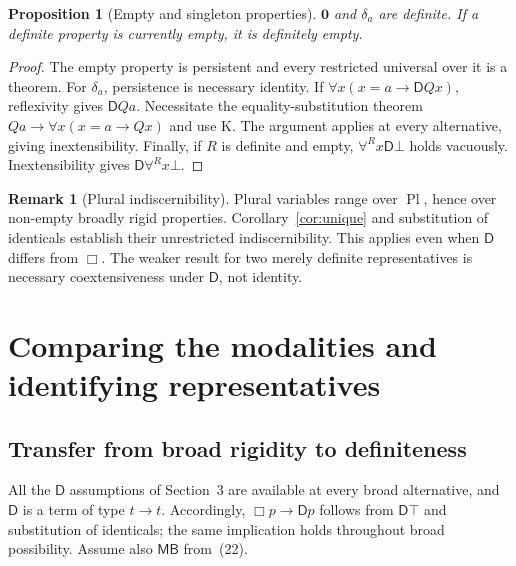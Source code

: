 \documentclass[11pt]{article}
\newtheorem{proposition}[theorem]{Proposition}
\theoremstyle{definition}
\newtheorem{remark}[theorem]{Remark}
\newcommand{\D}{\mathsf D}
\newcommand{\Pl}{\operatorname{Pl}}
\newcommand{\Z}{\mathbf 0}
\newcommand{\sng}[1]{\delta_{#1}}
\numberwithin{equation}{section}
\begin{document}
\begin{proposition}[Empty and singleton properties]\label{prop:singletons}
$\Z$ and $\sng a$ are definite. If a definite property is currently empty, it is definitely empty.
\end{proposition}
\begin{proof}
The empty property is persistent and every restricted universal over it is a theorem. For $\sng a$, persistence is necessary identity. If $\forall x(x=a\rightarrow\D Qx)$, reflexivity gives $\D Qa$. Necessitate the equality-substitution theorem $Qa\rightarrow\forall x(x=a\rightarrow Qx)$ and use K. The argument applies at every alternative, giving inextensibility. Finally, if $R$ is definite and empty, $\forall^R x\D\bot$ holds vacuously. Inextensibility gives $\D\forall^R x\bot$.
\end{proof}

\begin{remark}[Plural indiscernibility]
Plural variables range over $\Pl$, hence over non-empty broadly rigid properties. Corollary~\ref{cor:unique} and substitution of identicals establish their unrestricted indiscernibility. This applies even when $\D $ differs from $\Box$. The weaker result for two merely definite representatives is necessary coextensiveness under $\D $, not identity.
\end{remark}

\section{Comparing the modalities and identifying representatives}\label{app:identity}

\subsection{Transfer from broad rigidity to definiteness}

All the $\D $ assumptions of Section~3 are available at every broad alternative, and $\D $ is a term of type $t\to t$. Accordingly, $\Box p\rightarrow \D p$ follows from $\D \top$ and substitution of identicals; the same implication holds throughout broad possibility. Assume also $\mathsf{MB}$ from~\textup{(22)}.
\end{document}
